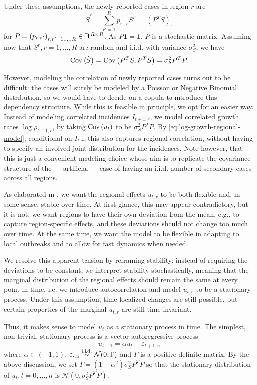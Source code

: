 Under these assumptions, the newly reported cases in region $r$ are 
$$
    \tilde S^{r} = \sum_{r'=1}^{R} p_{r',r} S^{r'} = (P^{T}S)_{r}
$$
for $ P = \left( p_{r, r'} \right)_{r,r' = 1, \dots, R} \in \mathbf R^{R\times R}$. As $P \mathbf 1 = \mathbf 1$, $P$ is a stochastic matrix. Assuming now that $S^{r}, r= 1, \dots, R$ are random and i.i.d. with variance $\sigma^{2}_S$, we have 
$$
    \operatorname{Cov} \left( \tilde S\right) = \operatorname{Cov} \left( P^{T}S, P^{T}S \right) = \sigma^{2}_SP^{T}P.
$$

However, modeling the correlation of newly reported cases turns out to be difficult: the cases will surely be modeled by a Poisson or Negative Binomial distribution, so we would have to decide on a copula to introduce this dependency structure. While this is feasible in principle, we opt for an easier way. Instead of modeling correlated incidences $I_{t + 1, r}$, we model correlated growth rates $\log \rho_{t + 1, r}$, by taking $\operatorname{Cov} \left( u_{t} \right)$ to be $\sigma^{2}_SP^{T}P$. By \eqref{eq:log-growth-regional-model}, conditional on $I_{t,r}$, this also captures regional correlation, without having to specify an involved joint distribution for the incidences. Note however, that this is just a convenient modeling choice whose aim is to replicate the covariance structure of the --- artificial --- case of having an i.i.d. number of secondary cases across all regions.

As elaborated in , we want the regional effects $u_{t,r}$ to be both flexible and, in some sense, stable over time. At first glance, this may appear contradictory, but it is not: we want regions to have their own deviation from the mean, e.g., to capture region-specific effects, and these deviations should not change too much over time. At the same time, we want the model to be flexible in adapting to local outbreaks and to allow for fast dynamics when needed. 

We resolve this apparent tension by reframing stability: instead of requiring the deviations to be constant, we interpret stability stochastically, meaning that the marginal distribution of the regional effects should remain the same at every point in time, i.e. we introduce autocorrelation and model $u_{t,r}$ to be a stationary process. Under this assumption, time-localized changes are still possible, but certain properties of the marginal $u_{t,r}$ are still time-invariant.

Thus, it makes sense to model $u_{t}$ as a stationary process in time. The simplest, non-trivial, stationary process is a vector-autoregressive process 
$$
    u_{t + 1} = \alpha u_{t} + \varepsilon_{t + 1, u}
$$
where $\alpha \in (-1, 1)$, $\varepsilon_{\cdot,u} \stackrel{\text{i.i.d.}}{\sim} \mathcal N(0, \Gamma)$ and $\Gamma$ is a positive definite matrix. By the above discussion, we set $\Gamma = (1-\alpha^{2}) \sigma^{2}_{S}P^{T}P$ so that the stationary distribution of $u_{t}, t = 0, \dots, n$  is $\mathcal N(0, \sigma^{2}_SP^{T}P)$. 

